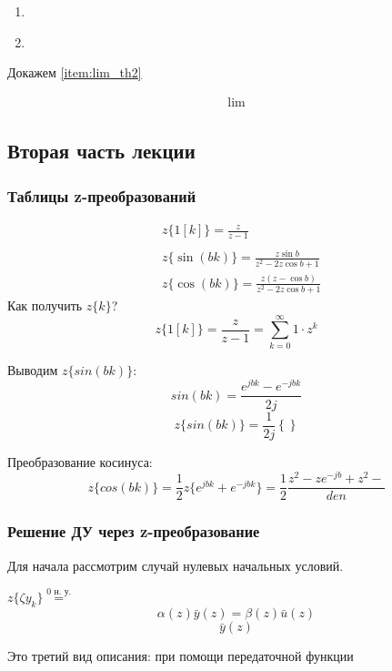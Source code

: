 \documentclass[main.tex]{subfiles}
\begin{document}
\begin{enumerate}[noitemsep]
	\begin{enumerate}[noitemsep]
		\item %
		\item \label{item:lim_th2}
	\end{enumerate}

	Докажем \ref{item:lim_th2} %
	
	\begin{align*}
		\lim\limits_{  }
	\end{align*}
	
\end{enumerate}

\subsection{ Вторая часть лекции }
\subsubsection{ Таблицы z-преобразований }

\begin{align*}
	& z\{ 1[k] \} = \frac{ z }{ z - 1 } \\
	& \\ %
	& z\{ \sin(bk) \} = \frac{ z \sin b }{z^2 - 2z \cos b + 1} \\
	& z\{ \cos(bk) \} = \frac{z (z - \cos b)}{z^2 - 2z \cos b + 1}
\end{align*}
Как получить $ z\{ k \} $?
\[ z\{ 1[k] \} = \frac{ z }{ z - 1 } = \sum_{k=0}^{\infty} 1 \cdot z^k  \] %

Выводим $ z\{sin(bk)\} $:
\[ sin(bk) = \frac{ e^{jbk} - e^{-jbk} }{2j} \]
\[ z\{sin(bk)\} = \frac{1}{2 j} \left\{  \right\} \] %

Преобразование косинуса:
\[ z \{ cos(bk) \} = \frac{1}{2} z\{ e^{jbk} + e^{-jbk} \} = \frac{1}{2} \frac{z^2 - z e^{-jb} + z^2 - }{den} \]

\subsubsection{ Решение ДУ через z-преобразование }

Для начала рассмотрим случай нулевых начальных условий.

 $ z\{\zeta y_k \} \overset{0 \text{ н. у.} }=  $
\[ \alpha(z) \bar y(z) = \beta(z) \bar u(z) \]
\[ \bar y(z) \]%

Это третий вид описания: при помощи передаточной функции
\end{document}
